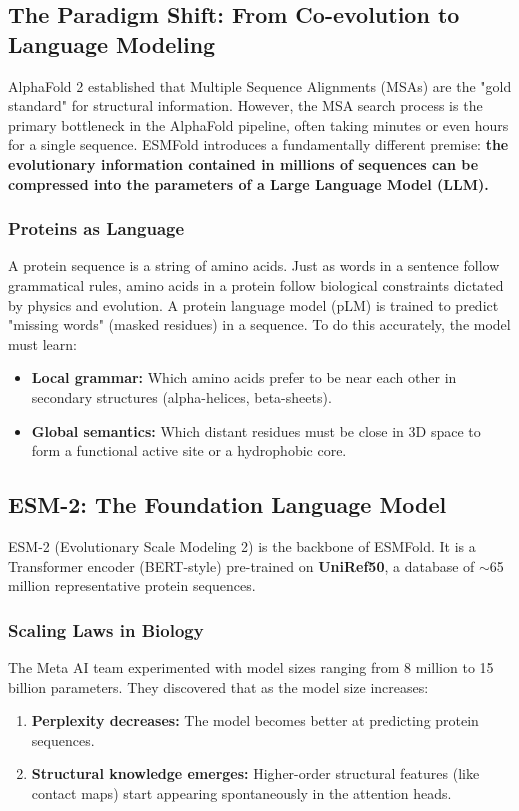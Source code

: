 ﻿\documentclass[12pt,a4paper]{article}
\begin{document}
\subsection{The Paradigm Shift: From Co-evolution to Language Modeling}

AlphaFold 2 established that Multiple Sequence Alignments (MSAs) are the "gold standard" for structural information. However, the MSA search process is the primary bottleneck in the AlphaFold pipeline, often taking minutes or even hours for a single sequence. ESMFold introduces a fundamentally different premise: \textbf{the evolutionary information contained in millions of sequences can be compressed into the parameters of a Large Language Model (LLM).}

\subsubsection{Proteins as Language}
A protein sequence is a string of amino acids. Just as words in a sentence follow grammatical rules, amino acids in a protein follow biological constraints dictated by physics and evolution. A protein language model (pLM) is trained to predict "missing words" (masked residues) in a sequence. To do this accurately, the model must learn:
\begin{itemize}[leftmargin=*, itemsep=4pt]
  \item \textbf{Local grammar:} Which amino acids prefer to be near each other in secondary structures (alpha-helices, beta-sheets).
  \item \textbf{Global semantics:} Which distant residues must be close in 3D space to form a functional active site or a hydrophobic core.
\end{itemize}

\subsection{ESM-2: The Foundation Language Model}

ESM-2 (Evolutionary Scale Modeling 2) is the backbone of ESMFold. It is a Transformer encoder (BERT-style) pre-trained on \textbf{UniRef50}, a database of $\sim$65 million representative protein sequences.

\subsubsection{Scaling Laws in Biology}
The Meta AI team experimented with model sizes ranging from 8 million to 15 billion parameters. They discovered that as the model size increases:
\begin{enumerate}[leftmargin=*, itemsep=4pt]
    \item \textbf{Perplexity decreases:} The model becomes better at predicting protein sequences.
    \item \textbf{Structural knowledge emerges:} Higher-order structural features (like contact maps) start appearing spontaneously in the attention heads.
\end{enumerate}
\end{document}
